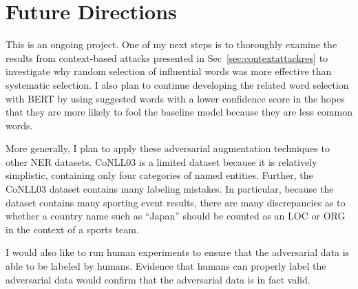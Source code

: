 \newpage

\section{Future Directions}
This is an ongoing project. One of my next steps is to thoroughly examine the results from context-based attacks presented in Sec~\ref{sec:contextattackres} to investigate why random selection of influential words was more effective than systematic selection. I also plan to continue developing the related word selection with BERT by using suggested words with a lower confidence score in the hopes that they are more likely to fool the baseline model because they are less common words.

More generally, I plan to apply these adversarial augmentation techniques to other NER datasets. CoNLL03 is a limited dataset because it is relatively simplistic, containing only four categories of named entities. Further, the CoNLL03 dataset contains many labeling mistakes. In particular, because the dataset contains many sporting event results, there are many discrepancies as to whether a country name such as ``Japan'' should be counted as an \textsc{LOC} or \textsc{ORG} in the context of a sports team.

I would also like to run human experiments to ensure that the adversarial data is able to be labeled by humans. Evidence that humans can properly label the adversarial data would confirm that the adversarial data is in fact valid.


